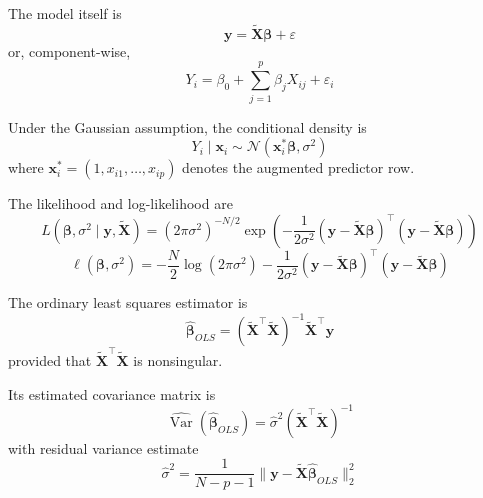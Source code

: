 The model itself is
\begin{equation}
    \mathbf{y} = \tilde{\mathbf{X}}\boldsymbol{\beta} + \varepsilon
\end{equation}
or, component-wise,
\begin{equation}
    Y_i = \beta_0 + \sum_{j=1}^{p}\beta_j X_{ij} + \varepsilon_i
\end{equation}

Under the Gaussian assumption, the conditional density is
\begin{equation}
    Y_i \mid \mathbf{x}_i \sim \mathcal{N}\!\left(\mathbf{x}_i^\ast \boldsymbol{\beta}, \sigma^2\right)
\end{equation}
where $\mathbf{x}_i^\ast = (1,x_{i1},\dots,x_{ip})$ denotes the augmented predictor row.

The likelihood and log-likelihood are
\begin{equation}
    L(\boldsymbol{\beta},\sigma^2 \mid \mathbf{y},\tilde{\mathbf{X}})
    =
    (2\pi\sigma^2)^{-N/2}
    \exp\!\left(
    -\frac{1}{2\sigma^2}
    (\mathbf{y} - \tilde{\mathbf{X}}\boldsymbol{\beta})^\top
    (\mathbf{y} - \tilde{\mathbf{X}}\boldsymbol{\beta})
    \right)
\end{equation}
\begin{equation}
    \ell(\boldsymbol{\beta},\sigma^2)
    =
    -\frac{N}{2}\log(2\pi\sigma^2)
    -\frac{1}{2\sigma^2}
    (\mathbf{y} - \tilde{\mathbf{X}}\boldsymbol{\beta})^\top
    (\mathbf{y} - \tilde{\mathbf{X}}\boldsymbol{\beta})
\end{equation}

The ordinary least squares estimator is
\begin{equation}
    \hat{\boldsymbol{\beta}}_{OLS}
    =
    (\tilde{\mathbf{X}}^\top \tilde{\mathbf{X}})^{-1}\tilde{\mathbf{X}}^\top \mathbf{y}
\end{equation}
provided that $\tilde{\mathbf{X}}^\top \tilde{\mathbf{X}}$ is nonsingular.

Its estimated covariance matrix is
\begin{equation}
    \widehat{\operatorname{Var}}(\hat{\boldsymbol{\beta}}_{OLS})
    =
    \hat{\sigma}^2 (\tilde{\mathbf{X}}^\top \tilde{\mathbf{X}})^{-1}
\end{equation}
with residual variance estimate
\begin{equation}
    \hat{\sigma}^2
    =
    \frac{1}{N-p-1}
    \|\mathbf{y} - \tilde{\mathbf{X}}\hat{\boldsymbol{\beta}}_{OLS}\|_2^2
\end{equation}

